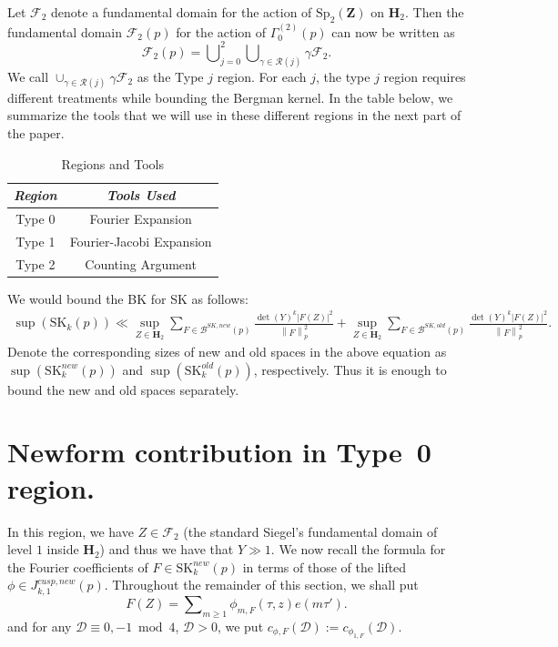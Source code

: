 \documentclass[11pt]{amsart}
\numberwithin{equation}{section}
\theoremstyle{plain}
\theoremstyle{definition}
\newcommand{\h}{\mf H}
\newcommand{\htwo}{\mf H_2}
\newcommand{\mf}{\mathbf}
\newcommand{\mc}{\mathcal}
\newcommand{\mrm}{\mathrm}
\newcommand*{\norm}[1]{\left\lVert#1\right\rVert}
\newcommand{\sumn}{\sum \nolimits}
\newcommand{\sptwo}{\mrm{Sp}_2( \mf Z)}
\newcommand{\Gp}{\Gamma_0^{(2)}(p)}
\newcommand{\skk}{\mrm{SK}_k}
\newcommand{\skkp}{\mrm{SK}_k(p)}
\begin{document}
Let $\mc F_2$ denote a fundamental domain for the action of $\sptwo$ on $\htwo$. Then the fundamental domain $\mc F_2(p)$ for the action of $\Gp$ can now be written as
\begin{equation}
    \mc F_2(p)=  \bigcup \nolimits_{j=0}^{2} \bigcup \nolimits_{\gamma\in \mc R(j)} \gamma \mc F_2.
\end{equation}
We call $\cup_{\gamma\in \mc R(j)}\gamma\mc F_2$ as the Type $j$ region. For each $j$, the type $j$ region requires different treatments while bounding the Bergman kernel. In the table below, we summarize the tools that we will use in these different regions in the next part of the paper.
\begin{table}[h]
    \centering
    \begin{tabular}{|c|c|}
    \hline
    {\it Region} & {\it Tools Used} \\ \hline
        Type 0 &  Fourier Expansion \\ \hline
         Type 1 & Fourier-Jacobi Expansion \\ \hline
         Type 2 & Counting Argument \\ \hline
    \end{tabular}
    \caption{Regions and Tools}
    \label{tab:placeholder}
\end{table}

We would bound the BK for SK as follows:
\begin{align}\label{newoldsplit}
    \sup(\skkp)
    \ll \sup_{Z\in \mf H_2}\sum_{F\in \mc B^{SK, new}(p)}\frac{\det(Y)^k|F(Z)|^2}{\norm{F}^2_p}+ \sup_{Z\in \mf H_2}\sum_{F\in \mc B^{SK, old}(p)}\frac{\det(Y)^k|F(Z)|^2}{\norm{F}^2_p}.
\end{align}
Denote the corresponding sizes of new and old spaces in the above equation as $\sup(\skk^{new}(p))$ and $\sup(\skk^{old}(p))$, respectively. Thus it is enough to bound the new and old spaces separately.

\section{Newform contribution in Type~0 region.}\label{Type0}

In this region, we have $Z\in \mc F_2$ (the standard Siegel's fundamental domain of level $1$ inside $\h_2$) and thus we have that $Y\gg 1$. We now recall the formula for the Fourier coefficients of $F \in \skk^{new}(p)$ in terms of those of the lifted $\phi \in J_{k,1}^{cusp,new}(p)$. Throughout the remainder of this section, we shall put 
\begin{equation}
    F(Z) = \sumn_{m \ge 1} \phi_{m,F}(\tau,z) e(m \tau'). 
\end{equation}
and for any $\mc D \equiv 0,-1 \bmod{4}$, $\mc D>0$,
    we put $\displaystyle c_{\phi,F}(\mc D) := c_{\phi_{1,F}}(\mc D)$.
\end{document}
